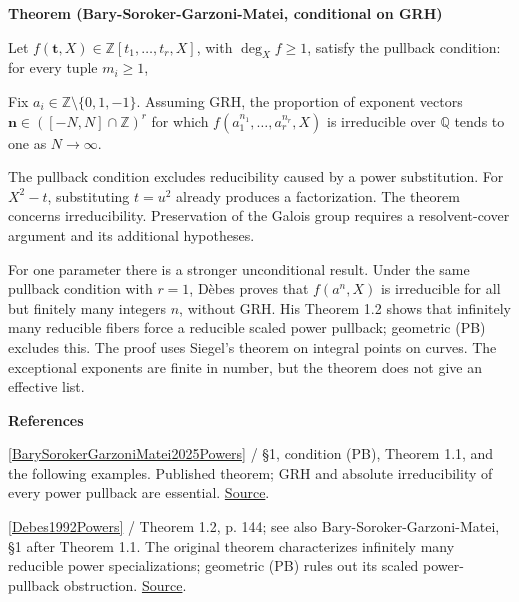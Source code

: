 \documentclass[11pt,a4paper,oneside,openany]{book}
\newcommand{\atlasdisplay}[1]{\par\begingroup\centering\vspace{3pt}\noindent\adjustbox{max width=\linewidth}{\(\displaystyle #1\)}\par\vspace{5pt}\endgroup}
\newenvironment{sources}{\par\smallskip\begingroup\footnotesize\color{atlasgray}\leftskip=10pt\setlength{\parskip}{2pt}}{\par\endgroup\smallskip}
\begin{document}
\begin{atlasblock}[standard]
\textbf{\sffamily Theorem (Bary-Soroker-Garzoni-Matei, conditional on GRH)}\par\smallskip
\color{black} Let \(f(\mathbf t,X)\in\mathbb Z[t_1,\ldots,t_r,X]\), with \(\deg_Xf\ge1\), satisfy the pullback condition: for every tuple \(m_i\ge1\),\par

\atlasdisplay{f(t_1^{m_1},\ldots,t_r^{m_r},X)\text{ is irreducible in }\overline{\mathbb Q}[\mathbf t,X].}
\color{black} Fix \(a_i\in\mathbb Z\setminus\{0,1,-1\}\). Assuming GRH, the proportion of exponent vectors \(\mathbf n\in([-N,N]\cap\mathbb Z)^r\) for which \(f(a_1^{n_1},\ldots,a_r^{n_r},X)\) is irreducible over \(\mathbb Q\) tends to one as \(N\to\infty\).\par
\end{atlasblock}\color{black}
\color{black} The pullback condition excludes reducibility caused by a power substitution. For \(X^2-t\), substituting \(t=u^2\) already produces a factorization. The theorem concerns irreducibility. Preservation of the Galois group requires a resolvent-cover argument and its additional hypotheses.\par
\color{black} For one parameter there is a stronger unconditional result. Under the same pullback condition with \(r=1\), Dèbes proves that \(f(a^n,X)\) is irreducible for all but finitely many integers \(n\), without GRH. His Theorem 1.2 shows that infinitely many reducible fibers force a reducible scaled power pullback; geometric (PB) excludes this. The proof uses Siegel's theorem on integral points on curves. The exceptional exponents are finite in number, but the theorem does not give an effective list.\par
\begin{sources}
\textbf{References}\par\smallskip
\noindent\hyperlink{ref:BarySorokerGarzoniMatei2025Powers}{[BarySorokerGarzoniMatei2025Powers]} / §1, condition (PB), Theorem 1.1, and the following examples. Published theorem; GRH and absolute irreducibility of every power pullback are essential. \href{https://doi.org/10.1007/s00209-025-03717-7}{Source}.\par
\noindent\hyperlink{ref:Debes1992Powers}{[Debes1992Powers]} / Theorem 1.2, p. 144; see also Bary-Soroker-Garzoni-Matei, §1 after Theorem 1.1. The original theorem characterizes infinitely many reducible power specializations; geometric (PB) rules out its scaled power-pullback obstruction. \href{https://doi.org/10.1016/0022-314X(92)90018-K}{Source}.\par
\end{sources}\color{black}
\end{document}

